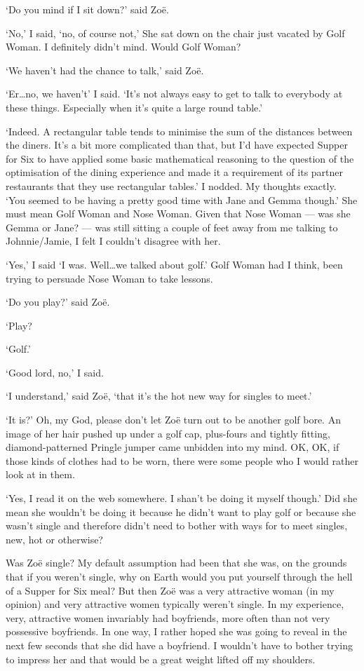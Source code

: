 `Do you mind if I sit down?' said Zo{\"e}.

`No,' I said, `no, of course not,' She sat down on the chair just
vacated by Golf Woman. I definitely didn't mind. Would Golf Woman?

`We haven't had the chance to talk,' said Zo{\"e}.

`Er\dots no, we haven't' I said. `It's not always easy to get to
talk to everybody at these things. Especially when it's quite a
large round table.'

`Indeed. A rectangular table tends to minimise the sum of the
distances between the diners. It's a bit more complicated than that,
but I'd have expected Supper for Six to have applied some basic
mathematical reasoning to the question of the optimisation of the dining
experience and made it a requirement of its partner restaurants that
they use rectangular tables.' I nodded. My thoughts exactly. `You
seemed to be having a pretty good time with Jane and Gemma though.'
She must mean Golf Woman and Nose Woman. Given that Nose Woman ---
was she Gemma or Jane? --- was still sitting a couple of feet away
from me talking to Johnnie/Jamie, I felt I couldn't disagree with
her.

`Yes,' I said `I was. Well\dots we talked about golf.' Golf Woman had
I think, been trying to persuade Nose Woman to take lessons.

`Do you play?' said Zo{\"e}.

`Play?

`Golf.'

`Good lord, no,' I said.

`I understand,' said Zo{\"e}, `that it's the hot new way for singles to
meet.'

`It is?' Oh, my God, please don't let Zo{\"e} turn out to be another
golf bore. An image of her hair pushed up under a golf cap,
plus-fours and tightly fitting, diamond-patterned Pringle jumper came
unbidden into my mind. OK, OK, if those kinds of clothes had to be
worn, there were some people who I would rather look at in
them.

`Yes, I read it on the web somewhere. I shan't be doing it myself
though.' Did she mean she wouldn't be doing it because he didn't
want to play golf or because she wasn't single and therefore didn't
need to bother with ways for to meet singles, new, hot or otherwise?

Was Zo{\"e} single? My default assumption had been that she was, on
the grounds that if you weren't single, why on Earth would you put
yourself through the hell of a Supper for Six meal? But then
Zo{\"e} was a very attractive woman (in my opinion) and very
attractive women typically weren't single. In my experience, very,
attractive women invariably had boyfriends, more often than not very
possessive boyfriends. In one way, I rather hoped she was going to
reveal in the next few seconds that she did have a boyfriend. I
wouldn't have to bother trying to impress her and that would be a
great weight lifted off my shoulders.

